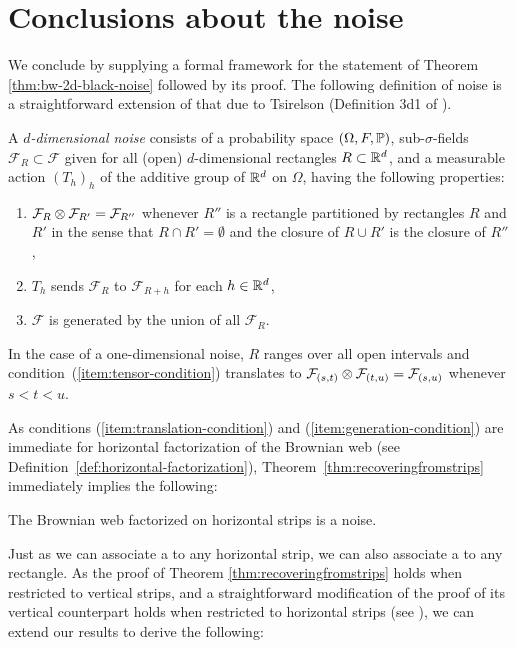 {
\section{Conclusions about the noise}
\label{sec:conclusions-about-the-noise}

We conclude by supplying a formal framework for the statement of
Theorem \ref{thm:bw-2d-black-noise} followed by its proof.
The following definition of noise is a straightforward extension of
that due to Tsirelson (Definition
3d1 of \cite{tsirelson-nonclassical-stochastic-flows}).

\newcommand{\F}{\mathcal{F}}
A \emph{$d$-dimensional noise} consists of a probability space $(\Omega,F,
\P)$, sub-$\sigma$-fields $\F_R \subset \F$ given for all (open)
$d$-dimensional rectangles $R \subset \R^d$, and a measurable action
$(T_h)_h$ of the additive group of $\R^d$ on $\Omega$, having the following properties:

\begin{enumerate}
\item \label{item:tensor-condition} $\F_R \tensor \F_{R'} = \F_{R''}$ whenever $R''$ is a
rectangle partitioned by rectangles $R$ and $R'$ in the sense that
$R\cap R'=\emptyset$ and the closure of $R \cup R'$
is the closure of $R''$,
\item \label{item:translation-condition} $T_h$ sends $\F_R$ to $\F_{R+h}$ for each $h \in \R^d$,
\item \label{item:generation-condition} $\F$ is generated by the union of all $\F_R$.
\end{enumerate}

In the case of a one-dimensional noise, $R$ ranges over all open intervals
and condition~(\ref{item:tensor-condition}) translates to
$\F_{(s,t)} \tensor \F_{(t,u)} = \F_{(s,u)}$ whenever $s < t < u$.


As conditions (\ref{item:translation-condition}) and
(\ref{item:generation-condition}) are immediate for
horizontal factorization of the Brownian web (see
Definition~\ref{def:horizontal-factorization}),
Theorem~\ref{thm:recoveringfromstrips} immediately
implies the following:

\begin{proposition*}
The Brownian web factorized on horizontal strips is a noise.
\end{proposition*}

Just as we can associate a \sigfield{} to any horizontal strip, we can
also associate a \sigfield{} to any rectangle.
As the proof of Theorem \ref{thm:recoveringfromstrips}
holds when restricted to vertical strips, and a straightforward
modification of the proof of its vertical
counterpart holds when restricted to horizontal strips
(see \cite{tsirelson-scaling-limit-noise-stability}),
we can extend our results to derive the following:

}
